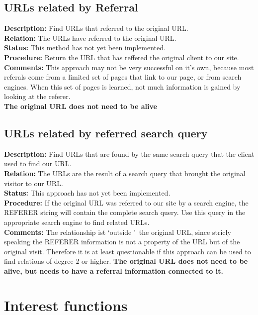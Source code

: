 \documentclass[a4paper]{danarticle}
\begin{document}
    \subsection*{URLs related by Referral}
      \textbf{Description:} Find URLs that referred to the original URL.
      \\
      \textbf{Relation:} The URLs have referred to the original URL.
      \\
      \textbf{Status:} This method has not yet been implemented.
      \\
      \textbf{Procedure:} Return the URL that has reffered the original
      client to our site. 
      \\
      \textbf{Comments:} This approach may not be very successful on it's own,
      because most referals come from a limited set of pages that link to our
      page, or from search engines. When this set of pages is learned, not much 
      information is gained by looking at the referer. 
      \\
      \textbf{The original URL does not need to be alive}
    \subsection*{URLs related by referred search query}
      \textbf{Description:} Find URLs that are found by the same search 
      query that the client used to find our URL.
      \\
      \textbf{Relation:} The URLs are the result of a search query that brought
      the original visitor to our URL. 
      \\
      \textbf{Status:} This approach has not yet been implemented.
      \\
      \textbf{Procedure:} If the original URL was referred to our site
      by a search engine, the REFERER string will contain the complete
      search query. Use this query in the appropriate search engine to find
      related URLs.
      \\
      \textbf{Comments:} The relationship ist \lq outside \rq\ the original
      URL, since stricly speaking the REFERER information is not a property
      of the URL but of the original visit. Therefore it is at least
      questionable if this approach can be used to find relations of degree 2 or
      higher.
      \textbf{The original URL does not need to be alive, but needs to have
      a referral information connected to it.}
  \section*{Interest functions}
\end{document}
